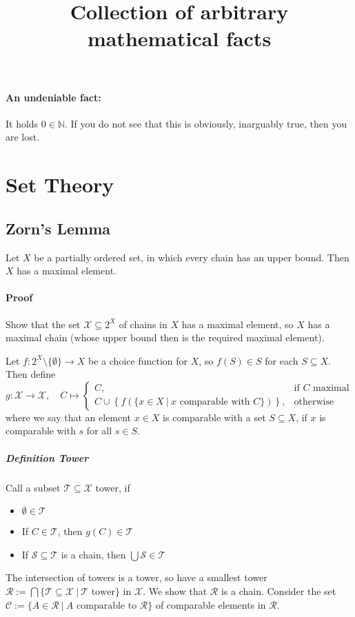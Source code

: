 \documentclass{scrartcl}
\title{Collection of arbitrary mathematical facts}
\date{}
\newcommand{\N}{\mathbb{N}}
\begin{document}
\maketitle

\tableofcontents

\paragraph{An undeniable fact:} It holds $0 \in \N$. If you do not see that this is obviously, inarguably true, then you are lost.

\section{Set Theory}

\subsection{Zorn's Lemma}
Let $X$ be a partially ordered set, in which every chain has an upper bound. Then $X$ has a maximal element.
\paragraph{Proof} Show that the set $\mathcal{X} \subseteq 2^X$ of chains in $X$ has a maximal element, so $X$ has a maximal chain (whose upper bound then is the required maximal element).

Let $f: 2^X \setminus \{\emptyset\} \to X$ be a choice function for $X$, so $f(S) \in S$ for each $S \subseteq X$. Then define
\begin{equation}
    g: \mathcal{X} \to \mathcal{X}, \quad C \mapsto \begin{cases}
        C, & \text{if $C$ maximal} \\
        C \cup \left\{ f\left(\{ x \in X \ | \ \text{$x$ comparable with $C$} \}\right) \right\}, & \text{otherwise}
    \end{cases} \nonumber
\end{equation}
where we say that an element $x \in X$ is comparable with a set $S \subseteq X$, if $x$ is comparable with $s$ for all $s \in S$.
\subparagraph{Definition Tower} Call a subset $\mathcal{T} \subseteq \mathcal{X}$ tower, if
\begin{itemize}
    \item $\emptyset \in \mathcal{T}$
    \item If $C \in \mathcal{T}$, then $g(C) \in \mathcal{T}$
    \item If $\mathcal{S} \subseteq \mathcal{T}$ is a chain, then $\bigcup \mathcal{S} \in \mathcal{T}$
\end{itemize}
The intersection of towers is a tower, so have a smallest tower $\mathcal{R} := \bigcap \{ \mathcal{T} \subseteq \mathcal{X} \ | \ \text{$\mathcal{T}$ tower} \}$ in $\mathcal{X}$. We show that $\mathcal{R}$ is a chain. Consider the set $\mathcal{C} := \{ A \in \mathcal{R} \ | \ \text{$A$ comparable to $\mathcal{R}$}\}$ of comparable elements in $\mathcal{R}$.
\end{document}
